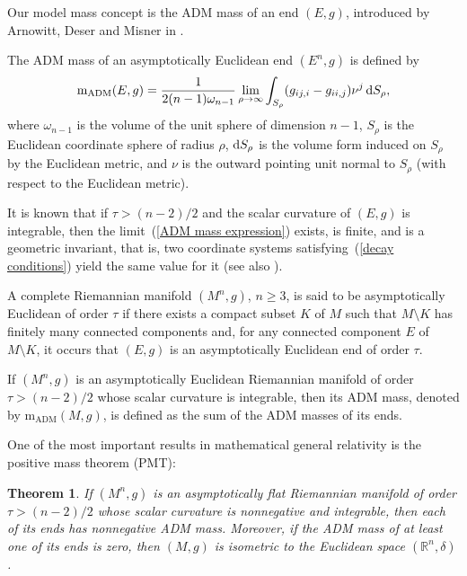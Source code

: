 \documentclass[pdftex]{sigma}
\numberwithin{equation}{section}
\newtheorem{Theorem}{Theorem}[section]
\begin{document}
Our model mass concept is the ADM mass of an end $(E,g)$, introduced by Arnowitt,
Deser and Misner in \cite{ArnowittCoordinateInvarianceEnergy1961}.

\begin{Definition}
 The ADM mass of an asymptotically Euclidean end \((E^n,g)\) is defined by
 \begin{equation} \label{ADM mass expression}
  \mathrm{m_{ADM}}(E,g) = \frac{1}{2(n-1)\omega_{n-1}} \lim_{\rho \to \infty} \int_{S_\rho} (g_{ij,i} - g_{ii,j}) \nu^j \,  {\rm d}S_\rho,
 \end{equation}
 where $\omega_{n-1}$ is the volume of the unit sphere of dimension $n-1$, $S_\rho$ is the Euclidean coordinate sphere of radius $\rho$, ${\rm d}S_\rho$ is the volume form induced on $S_\rho$ by the Euclidean metric, and $\nu $ is the outward pointing unit normal to $S_\rho$ (with respect to the Euclidean metric).
\end{Definition}

It is known that if $\tau > (n-2)/2$ and the scalar curvature of $(E,g)$ is integrable, then the limit~(\ref{ADM mass expression}) exists, is finite, and is a geometric invariant, that is, two coordinate systems satisfying~(\ref{decay conditions}) yield the same value for it \cite{Bartnikmassasymptoticallyflat1986, ChruscielBoundaryConditionsSpatial1986} (see also \cite{Michelgeometricinvariance2011}).

A complete Riemannian manifold $(M^n,g)$, $n \geq 3$, is said to be asymptotically Euclidean of order $\tau$ if there exists a compact subset $K$ of $M$ such that $M \setminus K$ has finitely many connected components and, for any connected component $E$ of $M \setminus K$, it occurs that $(E,g)$ is an asymptotically Euclidean end of order $\tau$.

If $(M^n,g)$ is an asymptotically Euclidean Riemannian manifold of order $\tau > (n-2)/2$ whose scalar curvature is integrable, then its ADM mass, denoted by $\mathrm{m}_{\mathrm{ADM}}(M,g)$, is defined as the sum of the ADM masses of its ends.

One of the most important results in mathematical general relativity is the positive mass theorem (PMT):

\begin{Theorem} %
   If $(M^n,g)$ is an asymptotically flat Riemannian manifold of order $\tau > (n-2)/2$ whose scalar curvature is nonnegative and integrable, then each of its ends has nonnegative ADM mass. Moreover, if the ADM mass of at least one of its ends is zero, then $(M,g)$ is isometric to the Euclidean space $(\mathbb{R}^n,\delta)$.
\end{Theorem}
\end{document}
